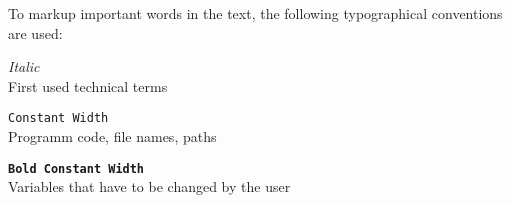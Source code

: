 To markup important words in the text, the following typographical conventions are used:

\begin{description}
\item \textit{Italic} \hfill \\
  First used technical terms
\item \texttt{Constant Width} \hfill \\
  Programm code, file names, paths
\item \textbf{\texttt{Bold Constant Width}} \hfill \\
  Variables that have to be changed by the user
\end{description}
